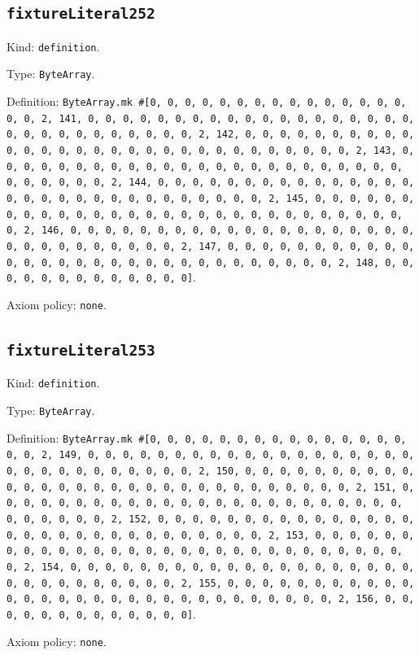\documentclass[11pt]{article}
\begin{document}
\subsection*{\texttt{fixtureLiteral252}}
\noindent Kind: \texttt{definition}.\par
\noindent Type: \texttt{ByteArray}.\par
\noindent Definition: \texttt{ByteArray.mk \#[0, 0, 0, 0, 0, 0, 0, 0, 0, 0, 0, 0, 0, 0, 0, 0, 0, 2, 141, 0, 0, 0, 0, 0, 0, 0, 0, 0, 0, 0, 0, 0, 0, 0, 0, 0, 0, 0, 0, 0, 0, 0, 0, 0, 0, 0, 0, 0, 0, 2, 142, 0, 0, 0, 0, 0, 0, 0, 0, 0, 0, 0, 0, 0, 0, 0, 0, 0, 0, 0, 0, 0, 0, 0, 0, 0, 0, 0, 0, 0, 0, 2, 143, 0, 0, 0, 0, 0, 0, 0, 0, 0, 0, 0, 0, 0, 0, 0, 0, 0, 0, 0, 0, 0, 0, 0, 0, 0, 0, 0, 0, 0, 0, 2, 144, 0, 0, 0, 0, 0, 0, 0, 0, 0, 0, 0, 0, 0, 0, 0, 0, 0, 0, 0, 0, 0, 0, 0, 0, 0, 0, 0, 0, 0, 0, 2, 145, 0, 0, 0, 0, 0, 0, 0, 0, 0, 0, 0, 0, 0, 0, 0, 0, 0, 0, 0, 0, 0, 0, 0, 0, 0, 0, 0, 0, 0, 0, 2, 146, 0, 0, 0, 0, 0, 0, 0, 0, 0, 0, 0, 0, 0, 0, 0, 0, 0, 0, 0, 0, 0, 0, 0, 0, 0, 0, 0, 0, 0, 0, 2, 147, 0, 0, 0, 0, 0, 0, 0, 0, 0, 0, 0, 0, 0, 0, 0, 0, 0, 0, 0, 0, 0, 0, 0, 0, 0, 0, 0, 0, 0, 0, 2, 148, 0, 0, 0, 0, 0, 0, 0, 0, 0, 0, 0, 0, 0]}.\par
\noindent Axiom policy: \texttt{none}.\par
\subsection*{\texttt{fixtureLiteral253}}
\noindent Kind: \texttt{definition}.\par
\noindent Type: \texttt{ByteArray}.\par
\noindent Definition: \texttt{ByteArray.mk \#[0, 0, 0, 0, 0, 0, 0, 0, 0, 0, 0, 0, 0, 0, 0, 0, 0, 2, 149, 0, 0, 0, 0, 0, 0, 0, 0, 0, 0, 0, 0, 0, 0, 0, 0, 0, 0, 0, 0, 0, 0, 0, 0, 0, 0, 0, 0, 0, 0, 2, 150, 0, 0, 0, 0, 0, 0, 0, 0, 0, 0, 0, 0, 0, 0, 0, 0, 0, 0, 0, 0, 0, 0, 0, 0, 0, 0, 0, 0, 0, 0, 2, 151, 0, 0, 0, 0, 0, 0, 0, 0, 0, 0, 0, 0, 0, 0, 0, 0, 0, 0, 0, 0, 0, 0, 0, 0, 0, 0, 0, 0, 0, 0, 2, 152, 0, 0, 0, 0, 0, 0, 0, 0, 0, 0, 0, 0, 0, 0, 0, 0, 0, 0, 0, 0, 0, 0, 0, 0, 0, 0, 0, 0, 0, 0, 2, 153, 0, 0, 0, 0, 0, 0, 0, 0, 0, 0, 0, 0, 0, 0, 0, 0, 0, 0, 0, 0, 0, 0, 0, 0, 0, 0, 0, 0, 0, 0, 2, 154, 0, 0, 0, 0, 0, 0, 0, 0, 0, 0, 0, 0, 0, 0, 0, 0, 0, 0, 0, 0, 0, 0, 0, 0, 0, 0, 0, 0, 0, 0, 2, 155, 0, 0, 0, 0, 0, 0, 0, 0, 0, 0, 0, 0, 0, 0, 0, 0, 0, 0, 0, 0, 0, 0, 0, 0, 0, 0, 0, 0, 0, 0, 2, 156, 0, 0, 0, 0, 0, 0, 0, 0, 0, 0, 0, 0, 0]}.\par
\noindent Axiom policy: \texttt{none}.\par
\end{document}
